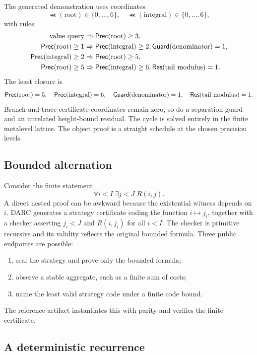 The generated demonstration uses coordinates
\[
 \Prec(\text{root})\in\{0,\ldots,6\},
 \quad
 \Prec(\text{integral})\in\{0,\ldots,6\},
\]
with rules
\begin{align*}
  \text{value query}&\Rightarrow \mathsf{Prec}(\text{root})\ge3,\\
  \mathsf{Prec}(\text{root})\ge1&\Rightarrow
       \mathsf{Prec}(\text{integral})\ge2,
       \mathsf{Guard}(\text{denominator})=1,\\
  \mathsf{Prec}(\text{integral})\ge2&\Rightarrow
       \mathsf{Prec}(\text{root})\ge5,\\
  \mathsf{Prec}(\text{root})\ge5&\Rightarrow
       \mathsf{Prec}(\text{integral})\ge6,
       \mathsf{Res}(\text{tail modulus})=1.
\end{align*}
The least closure is
\[
  \mathsf{Prec}(\text{root})=5,
  \quad \mathsf{Prec}(\text{integral})=6,
  \quad \mathsf{Guard}(\text{denominator})=1,
  \quad \mathsf{Res}(\text{tail modulus})=1.
\]
Branch and trace certificate coordinates remain zero; so do a separation guard
and an unrelated height-bound residual.  The cycle is solved entirely in the
finite metalevel lattice.  The object proof is a straight schedule at the
chosen precision levels.

\subsection{Bounded alternation}

Consider the finite statement
\[
  \forall i<I\;\exists j<J\;R(i,j).
\]
A direct nested proof can be awkward because the existential witness depends on
\(i\).  DARC generates a strategy certificate coding the function
\(i\mapsto j_i\), together with a checker asserting
\(j_i<J\) and \(R(i,j_i)\) for all \(i<I\).  The checker is primitive
recursive and its validity reflects the original bounded formula.  Three
public endpoints are possible:
\begin{enumerate}
  \item seal the strategy and prove only the bounded formula;
  \item observe a stable aggregate, such as a finite sum of costs;
  \item name the least valid strategy code under a finite code bound.
\end{enumerate}
The reference artifact instantiates this with parity and verifies the finite
certificate.

\subsection{A deterministic recurrence}

